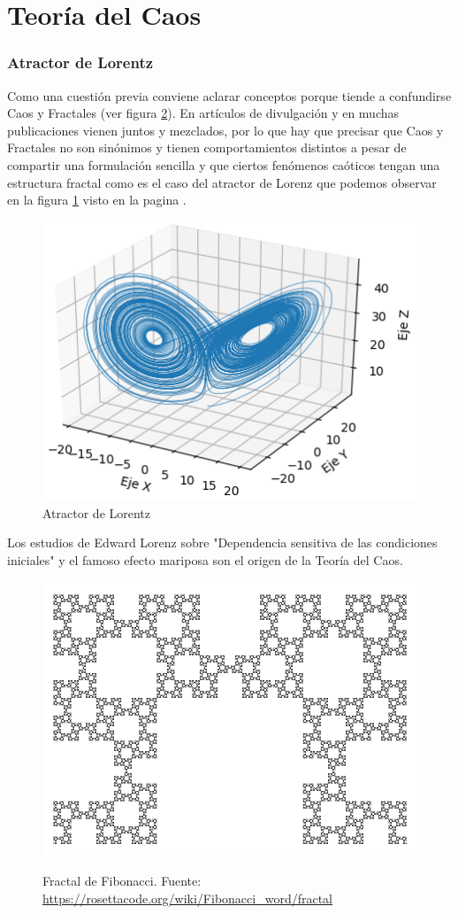 \part{Teoría del Caos}
\section{Atractor de Lorentz}
Como una cuestión previa conviene aclarar conceptos porque tiende a confundirse Caos y Fractales (ver figura \ref{img:fibo}). En artículos de divulgación y en muchas publicaciones vienen juntos y mezclados, por lo que hay que precisar que Caos y Fractales no son sinónimos y tienen comportamientos distintos a pesar de compartir una formulación sencilla y que ciertos fenómenos caóticos tengan una estructura fractal como es el caso del atractor de Lorenz que podemos observar en la figura \ref{img-lorentz} visto en la pagina \pageref{img-lorentz}.
\begin{figure}[H]
	\centering
	\includegraphics[scale=0.8]{img/tlorentz}
	\caption{Atractor de Lorentz}
	\label{img-lorentz}
\end{figure}
Los estudios de Edward Lorenz sobre  "Dependencia sensitiva de las condiciones iniciales" y el famoso efecto mariposa son el origen de la Teoría del Caos.
\begin{figure}[H]
	\centering
	\caption{Fractal de Fibonacci. Fuente: \url{https://rosettacode.org/wiki/Fibonacci_word/fractal}}
	\includegraphics[scale=0.6]{img/fractal}
	\label{img:fibo}
\end{figure}
